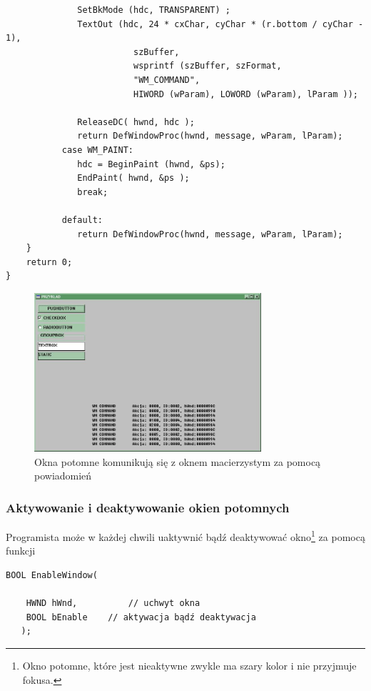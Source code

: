 \begin{scriptsize}
\begin{verbatim}
              SetBkMode (hdc, TRANSPARENT) ;
              TextOut (hdc, 24 * cxChar, cyChar * (r.bottom / cyChar - 1),
                         szBuffer,
                         wsprintf (szBuffer, szFormat,
                         "WM_COMMAND",
                         HIWORD (wParam), LOWORD (wParam), lParam ));

              ReleaseDC( hwnd, hdc );                
              return DefWindowProc(hwnd, message, wParam, lParam);
           case WM_PAINT:
              hdc = BeginPaint (hwnd, &ps);  
              EndPaint( hwnd, &ps );
              break;   
              
           default:                   
              return DefWindowProc(hwnd, message, wParam, lParam);
    }
    return 0;
}
\end{verbatim}
\end{scriptsize}

\begin{figure}
\begin{center}
\includegraphics[width=0.75\textwidth]{./pic/p01}
\caption{Okna potomne komunikują się z oknem macierzystym za pomocą powiadomień}
\end{center}
\end{figure}

\subsubsection{Aktywowanie i deaktywowanie okien potomnych}

Programista może w każdej chwili uaktywnić bądź deaktywować okno\footnote{Okno potomne, które
jest nieaktywne zwykle ma szary kolor i nie przyjmuje fokusa.} za pomocą funkcji

\begin{scriptsize}
\begin{verbatim}
BOOL EnableWindow(

    HWND hWnd,	        // uchwyt okna
    BOOL bEnable 	// aktywacja bądź deaktywacja
   );
\end{verbatim}
\end{scriptsize}

